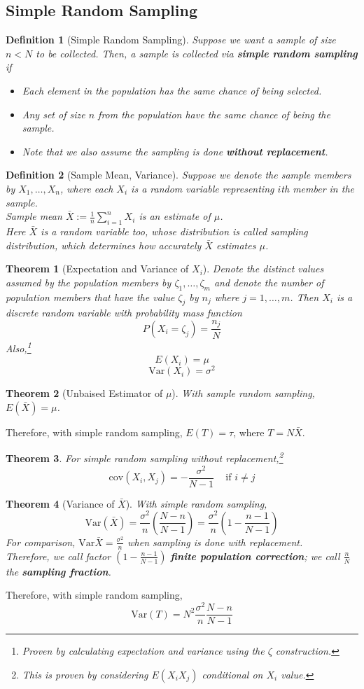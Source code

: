 \documentclass[12pt]{article}
\newcommand{\var}{\mathrm{Var}}
\newcommand{\cov}{\mathrm{cov}}
\newtheorem{definition}{Definition}[section]
\newtheorem{theorem}{Theorem}[section]
\theoremstyle{definition}
\begin{document}
\subsection{Simple Random Sampling}
\begin{definition}[Simple Random Sampling]
\normalfont Suppose we want a sample of size $n<N$ to be collected. Then, a sample is collected via \textbf{simple random sampling} if
\begin{itemize}
  \item Each element in the population has the same chance of being selected.
  \item Any set of size $n$ from the population have the same chance of being the sample.
  \item Note that we also assume the sampling is done \textbf{without replacement}.
\end{itemize}
\end{definition}
\begin{definition}[Sample Mean, Variance]
\normalfont Suppose we denote the sample members by $X_1,\ldots, X_n$, where each $X_i$ is a random variable representing $i$th member in the sample.\\
Sample mean $\bar{X}:=\frac{1}{n}\sum_{i=1}^n X_i$ is an estimate of $\mu$.\\
Here $\bar{X}$ is a random variable too, whose distribution is called sampling distribution, which determines how accurately $\bar{X}$ estimates $\mu$.
\end{definition}
\begin{theorem}[Expectation and Variance of {$X_i$}]
\normalfont Denote the distinct values assumed by the population members by $\zeta_1,\ldots,\zeta_m$ and denote the number of population members that have the value $\zeta_j$ by $n_j$ where $j=1,\ldots, m$. Then $X_i$ is a discrete random variable with probability mass function 
\[
P(X_i=\zeta_j) = \frac{n_j}{N}
\]
Also,\footnote{Proven by calculating expectation and variance using the $\zeta$ construction.}
\[
E(X_i) = \mu
\]
\[
\var(X_i)=\sigma^2
\]
\end{theorem}
\begin{theorem}[Unbaised Estimator of {$\mu$}]
\normalfont With sample random sampling, $E(\bar{X})=\mu$.
\end{theorem}
Therefore, with simple random sampling, $E(T)=\tau$, where $T=N\bar{X}$.
\begin{theorem}
\normalfont For simple random sampling without replacement,\footnote{This is proven by considering $E(X_iX_j)$ conditional on $X_i$ value.}
\[
\cov(X_i,X_j) = -\frac{\sigma^2}{N-1}\;\;\;\text{ if }i\neq j
\]
\end{theorem}
\begin{theorem}[Variance of {$\bar{X}$}]
\normalfont With simple random sampling,
\[
\var(\bar{X}) = \frac{\sigma^2}{n}(\frac{N-n}{N-1}) = \frac{\sigma^2}{n}(1-\frac{n-1}{N-1})
\]
For comparison, $\var{\bar{X}} = \frac{\sigma^2}{n}$ when sampling is done \textit{with} replacement.\\
Therefore, we call factor $(1-\frac{n-1}{N-1})$ \textbf{finite population correction}; we call $\frac{n}{N}$ the \textbf{sampling fraction}.
\end{theorem}
Therefore, with simple random sampling,
\[
\var(T) = N^2\frac{\sigma^2}{n}\frac{N-n}{N-1}
\]
\end{document}
